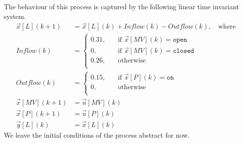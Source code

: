 The behaviour of this process is captured by the following linear time invariant system.
\begin{align}
  \vec{x}[L](k+1)&= \vec{x}[L](k)+Inflow(k)-Outflow(k),\quad \text{where}\\
  Inflow(k)&=\begin{cases}
    0.31,&\quad \text{if $\vec{x}[MV](k)=\texttt{open}$}\\
    0,&\quad \text{if $\vec{x}[MV](k)=\texttt{closed}$}\\
    0.26,&\quad \text{otherwise}\\
  \end{cases}\\
  Outflow(k)&=\begin{cases}
    0.15,&\quad \text{if $\vec{x}[P](k)=\texttt{on}$}\\
    0,&\quad \text{otherwise}\\
  \end{cases}\\
  \vec{x}[MV](k+1)&=\vec{u}[MV](k)\\
  \vec{x}[P](k+1)&=\vec{u}[P](k)\\
  \vec{y}[L](k)&=\vec{x}[L](k)
\end{align}
We leave the initial conditions of the process abstract for now.

